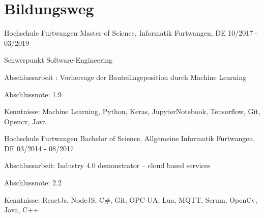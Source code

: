 
\section{Bildungsweg}
\cventry
{Hochschule Furtwangen} %
{Master of Science, Informatik} %
{Furtwangen, DE} %
{10/2017 - 03/2019} %
\begin{cvitems}
\item{ Schwerpunkt Software-Engineering}
\item {Abschlussarbeit : Vorhersage der Bauteillageposition durch Machine Learning}
\item {Abschlussnote: 1.9}
\item {Kenntnisse: Machine Learning, Python, Keras, JupyterNotebook, Tensorflow, Git, Opencv, Java}
\end{cvitems}

\cventry
{Hochschule Furtwangen} %
{Bachelor of Science, Allgemeine Informatik} %
{Furtwangen, DE} %
{03/2014 - 08/2017} %
\begin{cvitems}
\item {Abschlussarbeit: Industry 4.0 demonstrator – cloud based services}
\item {Abschlussnote: 2.2}
\item {Kenntnisse: ReactJs, NodeJS, C\#, Git, OPC-UA, Lua, MQTT, Scrum, OpenCv, Java, C++}
\end{cvitems}
